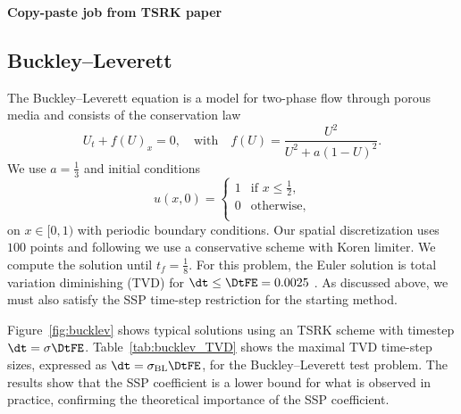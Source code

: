 \textbf{Copy-paste job from TSRK paper}

\subsection{Buckley--Leverett}

The Buckley--Leverett equation is a model for two-phase flow through
porous media and consists of the conservation law
\begin{equation*}
U_t + f(U)_x = 0, \quad \text{with} \quad
f(U) = \frac{U^2}{U^2 + a(1-U)^2}.
\end{equation*}
We use $a=\frac{1}{3}$ and initial conditions 
\begin{equation*}
  u(x,0)= \left\{  \begin{array}{ll}
      1 & \mbox{if $x \le \frac{1}{2}$,} \\
      0 & \mbox{otherwise,} \\ \end{array} \right.
\end{equation*}
on $x \in [0,1)$ with periodic boundary conditions.  Our spatial
discretization uses $100$ points and following
\cite{Hundsdorfer/Verwer:2003, Ketcheson2009_article} we use a conservative scheme with Koren limiter.  We
compute the solution until $t_f = \frac{1}{8}$.  For this problem, the
Euler solution is total variation diminishing (TVD) for $\dt \le \DtFE
= 0.0025$ \cite{Ketcheson2009_article}.  As
discussed above, we must also satisfy the SSP time-step restriction
for the starting method.





Figure~\ref{fig:bucklev} shows typical solutions using an TSRK scheme
with timestep $\dt = \sigma \DtFE$.  Table~\ref{tab:bucklev_TVD} shows
the maximal TVD time-step sizes, expressed as $\dt =
\sigma_{\text{BL}} \DtFE$, for the Buckley--Leverett test problem.
The results show that the SSP coefficient is a lower bound for what is
observed in practice, confirming the theoretical importance of the SSP
coefficient.


